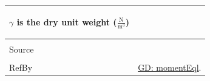 \documentclass[12pt]{article}
\begin{document}
\begin{minipage}{\textwidth}
\begin{tabular}{p{} p{}}
\begin{symbDescription}
                                                  \item{$γ$ is the dry unit weight ($\frac{\text{N}}{\text{m}^{3}}$)}
                                                  \end{symbDescription}
                                                  \\ \midrule \\
                                                  Source & \cite{fredlund1977}
                                                           \\ \midrule \\
                                                           RefBy & \hyperref[GD:momentEql]{GD: momentEql}.
\\ \bottomrule \end{tabular}
\end{minipage}
\par~
\end{document}
